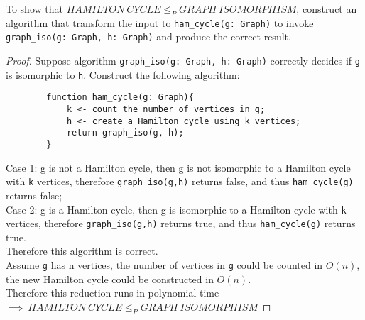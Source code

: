 \documentclass[letterpaper]{article}
\begin{document}
To show that $HAMILTON\ CYCLE \leq_P GRAPH\ ISOMORPHISM$, construct an algorithm that transform the input to \verb#ham_cycle(g: Graph)# to invoke \verb#graph_iso(g: Graph, h: Graph)# and produce the correct result.
\begin{proof}
    Suppose algorithm \verb#graph_iso(g: Graph, h: Graph)# correctly decides if \verb#g# is isomorphic to \verb#h#. Construct the following algorithm:
    \begin{verbatim}
        function ham_cycle(g: Graph){
            k <- count the number of vertices in g;
            h <- create a Hamilton cycle using k vertices;
            return graph_iso(g, h);
        }
    \end{verbatim}

    Case 1: g is not a Hamilton cycle, then g is not isomorphic to a Hamilton cycle with \verb#k# vertices, therefore \verb#graph_iso(g,h)# returns false, and thus \verb#ham_cycle(g)# returns false;\\
    Case 2: g is a Hamilton cycle, then g is isomorphic to a Hamilton cycle with \verb#k# vertices, therefore \verb#graph_iso(g,h)# returns true, and thus \verb#ham_cycle(g)# returns true.\\

    Therefore this algorithm is correct.\\

    Assume \verb#g# has n vertices, the number of vertices in \verb#g# could be counted in $O(n)$, the new Hamilton cycle could be constructed in $O(n)$.\\
    Therefore this reduction runs in polynomial time $\implies\ HAMILTON\ CYCLE \leq_P GRAPH\ ISOMORPHISM$
\end{proof}
\end{document}
